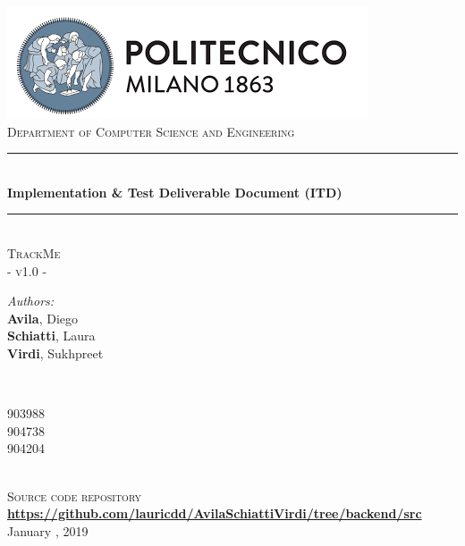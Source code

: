 \documentclass[a4paper, hidelinks, 12pt]{report}
\begin{document}
	\begin{titlepage}
		\centering
		\vspace*{0.7 cm}
		\includegraphics[scale = 0.85]{../Assets/PolimiLogo.png}\\[1.6 cm]
		\textsc{\large Department of Computer Science and Engineering}\\[1.8 cm]

		\rule{\linewidth}{0.2 mm} \\[0.4 cm]
		{ \huge \bfseries Implementation \& Test Deliverable Document (ITD)}\\
		\rule{\linewidth}{0.2 mm} \\[1.5 cm]

		\textsc{\Large TrackMe}\\[0.5 cm]
		\textsc{\large - v1.0 -}\\[1 cm]

		\begin{minipage}{0.4\textwidth}
			\begin{flushleft} \large
				\emph{Authors:}\\
				\textbf{Avila}, Diego \\
				\textbf{Schiatti}, Laura \\
				\textbf{Virdi}, Sukhpreet
			\end{flushleft}
		\end{minipage}~
		\begin{minipage}{0.4\textwidth}
			\begin{flushright} \large
				903988 \\
				904738 \\
				904204
			\end{flushright}
		\end{minipage}\\[2 cm]

		\textsc{\large Source code repository}
		\href{https://github.com/lauricdd/AvilaSchiattiVirdi/tree/backend/src}{\textbf{https://github.com/lauricdd/AvilaSchiattiVirdi/tree/backend/src}}\\[1 cm]

		{\large January  , 2019}\\[2 cm]

		\vfill
	\end{titlepage}
\end{document}
